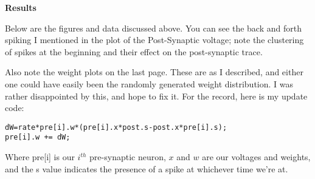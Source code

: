 \documentclass[a4paper,12pt]{article}
\begin{document}
\vfil\eject

{\bf Results}
\bigskip

Below are the figures and data discussed above. You can see the back and forth spiking I mentioned in the plot of the Post-Synaptic voltage; note the clustering of spikes at the beginning and their effect on the post-synaptic trace. 

\vspace{2mm}

Also note the weight plots on the last page. These are as I described, and either one could have easily been the randomly generated weight distribution. I was rather disappointed by this, and hope to fix it. For the record, here is my update code:

\begin{verbatim}
dW=rate*pre[i].w*(pre[i].x*post.s-post.x*pre[i].s);
pre[i].w += dW;
\end{verbatim}

Where pre[i] is our $i^{th}$ pre-synaptic neuron, $x$ and $w$ are our voltages and weights, and the s value indicates the presence of a spike at whichever time we're at. 

\begin{center}
\begin{figure}[ht!]
\end{figure}
\end{center}

\begin{center}
\begin{figure}[ht!]
\end{figure}
\end{center}

\begin{center}
\begin{figure}[ht!]
\end{figure}
\end{center}

\begin{center}
\begin{figure}[ht!]
\end{figure}
\end{center}
\end{document}
